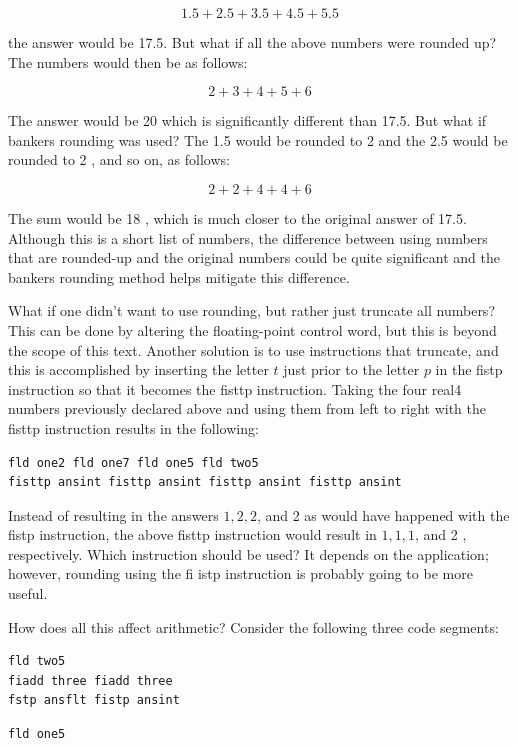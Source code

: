\documentclass[10pt]{book}
\begin{document}
\begin{center}
\begin{center}
\begin{center}
\begin{center}
$$
1.5+2.5+3.5+4.5+5.5
$$

the answer would be 17.5. But what if all the above numbers were rounded up? The numbers would then be as follows:

$$
2+3+4+5+6
$$

The answer would be 20 which is significantly different than 17.5. But what if bankers rounding was used? The 1.5 would be rounded to 2 and the 2.5 would be rounded to 2 , and so on, as follows:

$$
2+2+4+4+6
$$

The sum would be 18 , which is much closer to the original answer of 17.5. Although this is a short list of numbers, the difference between using numbers that are rounded-up and the original numbers could be quite significant and the bankers rounding method helps mitigate this difference.

What if one didn't want to use rounding, but rather just truncate all numbers? This can be done by altering the floating-point control word, but this is beyond the scope of this text. Another solution is to use instructions that truncate, and this is accomplished by inserting the letter $t$ just prior to the letter $p$ in the fistp instruction so that it becomes the fisttp instruction. Taking the four real4 numbers previously declared above and using them from left to right with the fisttp instruction results in the following:


\begin{verbatim}
fld one2 fld one7 fld one5 fld two5
fisttp ansint fisttp ansint fisttp ansint fisttp ansint
\end{verbatim}

Instead of resulting in the answers $1,2,2$, and 2 as would have happened with the fistp instruction, the above fisttp instruction would result in $1,1,1$, and 2 , respectively. Which instruction should be used? It depends on the application; however, rounding using the fi istp instruction is probably going to be more useful.

How does all this affect arithmetic? Consider the following three code segments:

\begin{verbatim}
fld two5
fiadd three fiadd three
fstp ansflt fistp ansint
\end{verbatim}

\begin{verbatim}
fld one5
\end{verbatim}


\end{center}
\end{center}
\end{center}
\end{center}
\end{document}
